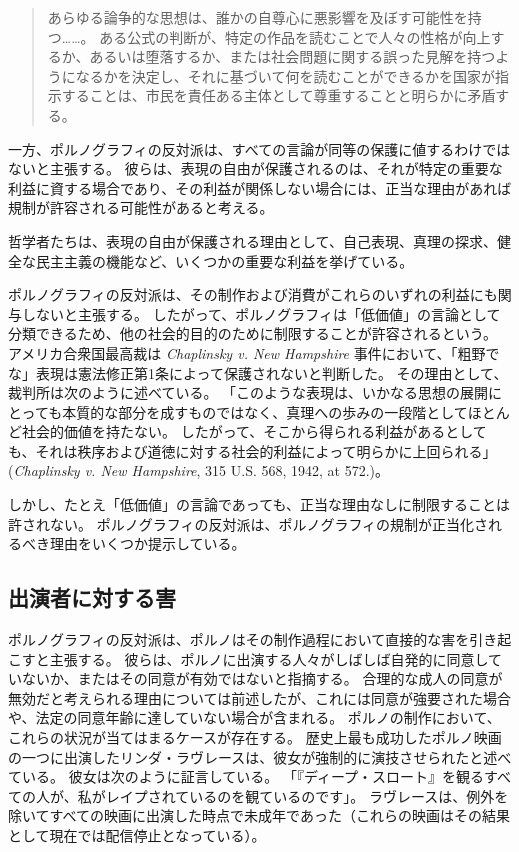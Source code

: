 \documentclass[paper=a4,book,openany]{jlreq} \usepackage{mystyle}
\begin{document}
\begin{quote}

あらゆる論争的な思想は、誰かの自尊心に悪影響を及ぼす可能性を持つ……。
ある公式の判断が、特定の作品を読むことで人々の性格が向上するか、あるいは堕落するか、または社会問題に関する誤った見解を持つようになるかを決定し、それに基づいて何を読むことができるかを国家が指示することは、市民を責任ある主体として尊重することと明らかに矛盾する。
\citep[pp.206--208]{dworkin96:_freed_law}

\end{quote}

一方、ポルノグラフィの反対派は、すべての言論が同等の保護に値するわけではないと主張する。
彼らは、表現の自由が保護されるのは、それが特定の重要な利益に資する場合であり、その利益が関係しない場合には、正当な理由があれば規制が許容される可能性があると考える。

哲学者たちは、表現の自由が保護される理由として、自己表現、真理の探求、健全な民主主義の機能など、いくつかの重要な利益を挙げている\citep{scanlon11:_why_not_base_free_speec_auton_democ}。

ポルノグラフィの反対派は、その制作および消費がこれらのいずれの利益にも関与しないと主張する。
したがって、ポルノグラフィは「低価値」の言論として分類できるため、他の社会的目的のために制限することが許容されるという。
アメリカ合衆国最高裁は \emph{Chaplinsky v. New Hampshire} 事件において、「粗野でな」表現は憲法修正第1条によって保護されないと判断した。
その理由として、裁判所は次のように述べている。
「このような表現は、いかなる思想の展開にとっても本質的な部分を成すものではなく、真理への歩みの一段階としてほとんど社会的価値を持たない。
したがって、そこから得られる利益があるとしても、それは秩序および道徳に対する社会的利益によって明らかに上回られる」(\emph{Chaplinsky v. New Hampshire}, 315 U.S. 568, 1942, at 572.)。

しかし、たとえ「低価値」の言論であっても、正当な理由なしに制限することは許されない。
ポルノグラフィの反対派は、ポルノグラフィの規制が正当化されるべき理由をいくつか提示している。

\subsection{出演者に対する害}

ポルノグラフィの反対派は、ポルノはその制作過程において直接的な害を引き起こすと主張する。
彼らは、ポルノに出演する人々がしばしば自発的に同意していないか、またはその同意が有効ではないと指摘する。
合理的な成人の同意が無効だと考えられる理由については前述したが、これには同意が強要された場合や、法定の同意年齢に達していない場合が含まれる。
ポルノの制作において、これらの状況が当てはまるケースが存在する。
歴史上最も成功したポルノ映画の一つに出演したリンダ・ラヴレースは、彼女が強制的に演技させられたと述べている。
彼女は次のように証言している。
「『ディープ・スロート』を観るすべての人が、私がレイプされているのを観ているのです」\citep{bailey05:_insid_deep_throat}。
ラヴレースは、例外を除いてすべての映画に出演した時点で未成年であった（これらの映画はその結果として現在では配信停止となっている）。
\end{document}
